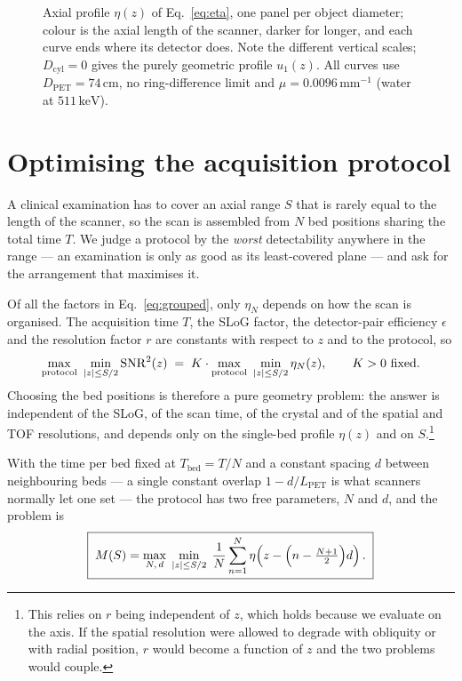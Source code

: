 \documentclass[11pt,a4paper]{article}
\newcommand{\Lpet}{L_{\mathrm{PET}}}
\newcommand{\Dpet}{D_{\mathrm{PET}}}
\newcommand{\Dcyl}{D_{\mathrm{cyl}}}
\DeclarePairedDelimiter{\abs}{\lvert}{\rvert}
\begin{document}
\begin{figure}[tbp]
\centering

\caption{Axial profile $\eta(z)$ of Eq.~\eqref{eq:eta}, one panel per object diameter;
colour is the axial length of the scanner, darker for longer, and each curve ends where
its detector does. Note
the different vertical scales; $\Dcyl=0$ gives the purely geometric profile $u_1(z)$. All
curves use $\Dpet=74\,\mathrm{cm}$, no ring-difference limit and
$\mu=0.0096\,\mathrm{mm^{-1}}$ (water at $511\,\mathrm{keV}$).}
\label{fig:profile}
\end{figure}

\section{Optimising the acquisition protocol}
\label{sec:beds}

A clinical examination has to cover an axial range $S$ that is rarely equal to the length of
the scanner, so the scan is assembled from $N$ bed positions sharing the total time $T$. We
judge a protocol by the \emph{worst} detectability anywhere in the range --- an examination
is only as good as its least-covered plane --- and ask for the arrangement that maximises it.

Of all the factors in Eq.~\eqref{eq:grouped}, only $\eta_N$ depends on how the scan is
organised. The acquisition time $T$, the SLoG factor, the detector-pair efficiency
$\epsilon$ and the resolution factor $r$ are constants with respect to $z$ and to the
protocol, so
\begin{equation}
  \max_{\text{protocol}}\ \min_{\abs{z}\le S/2}\mathrm{SNR}^{2}(z)
  \;=\;K\cdot\max_{\text{protocol}}\ \min_{\abs{z}\le S/2}\eta_N(z),
  \qquad K>0 \ \text{fixed}.
  \label{eq:decouple}
\end{equation}
Choosing the bed positions is therefore a pure geometry problem: the answer is independent
of the SLoG, of the scan time, of the crystal and of the spatial and TOF resolutions, and
depends only on the single-bed profile $\eta(z)$ and on $S$.\footnote{This relies on $r$
being independent of $z$, which holds because we evaluate on the axis. If the spatial
resolution were allowed to degrade with obliquity or with radial position, $r$ would become
a function of $z$ and the two problems would couple.}

With the time per bed fixed at $T_{\mathrm{bed}}=T/N$ and a constant spacing $d$ between
neighbouring beds --- a single constant overlap $1-d/\Lpet$ is what scanners normally let
one set --- the protocol has two free parameters, $N$ and $d$, and the problem is
\begin{equation}
  \boxed{\;M(S)=\max_{N,\,d}\;\min_{\abs{z}\le S/2}\;
       \frac{1}{N}\sum_{n=1}^{N}\eta\!\left(z-\Big(n-\tfrac{N+1}{2}\Big)d\right).\;}
  \label{eq:maxmin}
\end{equation}
\end{document}
